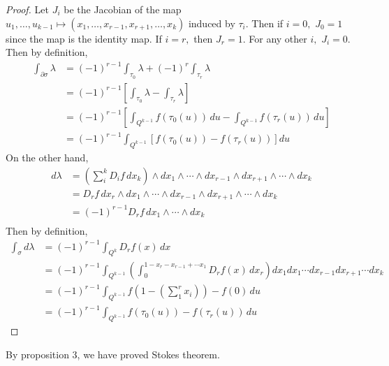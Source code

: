 \documentclass[10pt, oneside]{article}
\theoremstyle{definition}
\begin{document}
\begin{proof}
    Let $J_{i}$ be the Jacobian of the map $u_1, \dots, u_{k-1}\mapsto (x_1, \dots, x_{r-1}, x_{r + 1}, \dots, x_k)$ induced by $\tau_i.$ Then if $i = 0,$ $J_0 = 1$ since the map is the identity map. If $i = r,$ then $J_r = 1.$ For any other $i,$ $J_i = 0.$ Then by definition, 
    \begin{align*}
    \int_{\partial \sigma}\lambda &= (-1)^{r-1}\int_{\tau_0}\lambda + (-1)^r \int_{\tau_r}\lambda\\
    & =(-1)^{r-1}\left[\int_{\tau_0}\lambda - \int_{\tau_r}\lambda \right]\\
    &=(-1)^{r-1}\left[\int_{Q^{k-1}}f(\tau_0(u))\,du - \int_{Q^{k-1}}f(\tau_r(u))\,du\right]\\ 
    &= (-1)^{r-1}\int_{Q^{k-1}} \left[f(\tau_0(u)) - f(\tau_r(u))\right]du
    \end{align*}
    On the other hand, 
    \begin{align*}
      d\lambda &= \left(\sum_i^k D_if \,dx_k\right)\wedge dx_1 \wedge \cdots\wedge dx_{r-1}\wedge dx_{r+1}\wedge \cdots \wedge dx_k\\ &= D_r f\,dx_r \wedge dx_1 \wedge \cdots\wedge dx_{r-1}\wedge dx_{r+1}\wedge \cdots \wedge dx_k  \\
      &= (-1)^{r-1} D_r f\, dx_1 \wedge \cdots \wedge dx_k\\
    \end{align*}
    Then by definition,
    \begin{align*}
        \int_\sigma d\lambda &= (-1)^{r-1}\int_{Q^k}D_r f(x)\,dx\\
        &= (-1)^{r-1} \int_{Q^{k-1}}\left(\int_0^{1-x_r - x_{r-1} + \cdots x_1} D_rf(x)\,dx_r\right)dx_1 dx_1\cdots dx_{r-1}dx_{r+1}\cdots dx_k\\
        &= (-1)^{r-1}\int_{Q^{k-1}}f(1- (\sum_{1}^r x_i)) - f(0)\,du\\
        &= (-1)^{r-1}\int_{Q^{k-1}}f(\tau_0(u)) - f(\tau_r(u))\,du
    \end{align*}
\end{proof}
By proposition 3, we have proved Stokes theorem.

\newpage
\end{document}
